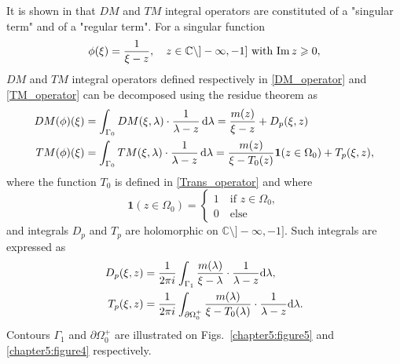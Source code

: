 It is shown in \cite{CroisilleLebeau} that $DM$ and $TM$ integral operators are constituted of a "singular term" and of a "regular term". For a singular function 
\begin{equation}
\label{Chapter5:arbitrary_function}
\phi(\xi) = \dfrac{1}{\xi - z},  \quad z \in \mathbb{C}\setminus ]-\infty,-1] \text{ with } {\rm Im} \, z \geqslant 0,
\end{equation}
$DM$ and $TM$ integral operators defined respectively in \eqref{DM_operator} and \eqref{TM_operator} can be decomposed using the residue theorem as
\begin{subequations}
\label{Int_op_decomp}
\begin{align}
\label{Int_op_decomp_DM}
DM(\phi)(\xi) &= \int_{\Gamma_0} DM(\xi,\lambda) \cdot \dfrac{1}{\lambda - z} \, {\rm d} \lambda = \dfrac{m(z)}{\xi - z}  + D_p(\xi,z) \\
\label{Int_op_decomp_TM}
TM(\phi)(\xi) &= \int_{\Gamma_0} TM(\xi,\lambda) \cdot \dfrac{1}{\lambda - z} \, {\rm d} \lambda = \dfrac{m(z) }{\xi - T_0(z)} \mathbf{1} (z \in \Omega_0) + T_p(\xi,z),
\end{align}
\end{subequations}
where the function $T_0$ is defined in \eqref{Trans_operator} and where
\begin{equation}
\mathbf{1} (z \in \Omega_0) = 
\begin{cases}
1 \quad \text{if } z  \in \Omega_0, \\
0 \quad \text{else}
\end{cases}
\end{equation}
and integrals $D_p$ and $T_p$ are holomorphic on $\mathbb{C}\setminus ]-\infty,-1]$. Such integrals are expressed as
\begin{subequations}
\label{holomorphic_functions}
\begin{align}
\label{defDp}
D_p(\xi,z) &= \dfrac{1}{2\pi i}\int_{\Gamma_1} \dfrac{m(\lambda)}{\xi-\lambda} \cdot \dfrac{1}{\lambda - z} {\rm d}\lambda, \\
\label{defTp}
T_p(\xi,z) &= \dfrac{1}{2\pi i}\int_{\partial \Omega_0^+}  \dfrac{m(\lambda)}{\xi-T_0(\lambda)} \cdot \dfrac{1}{\lambda - z} {\rm d}\lambda.
\end{align}
\end{subequations}
Contours $\Gamma_1$ and $\partial \Omega_0^+$ are illustrated on Figs.~\ref{chapter5:figure5} and \ref{chapter5:figure4} respectively.

